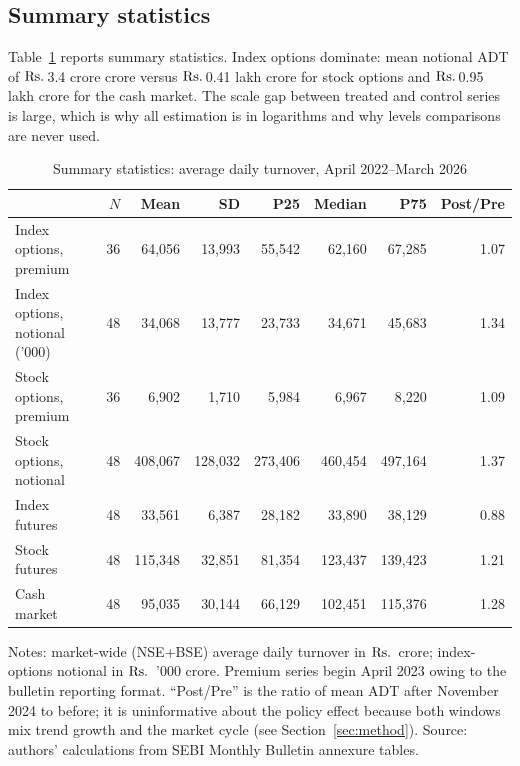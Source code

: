 \documentclass[12pt]{article}
\newcommand{\rupee}{\text{Rs.}\,}
\begin{document}
\subsection{Summary statistics}

Table~\ref{tab:sumstats} reports summary statistics. Index options dominate:
mean notional ADT of \(\text{\rupee}\)3.4 crore crore versus
\(\text{\rupee}\)0.41 lakh crore for stock options and
\(\text{\rupee}\)0.95 lakh crore for the cash market. The scale gap between
treated and control series is large, which is why all estimation is in
logarithms and why levels comparisons are never used.

\begin{table}[H]
\centering
\caption{Summary statistics: average daily turnover, April 2022--March 2026}
\label{tab:sumstats}
\small
\begin{threeparttable}
\begin{tabular}{lrrrrrrr}
\toprule
 & $N$ & Mean & SD & P25 & Median & P75 & Post/Pre \\
\midrule
Index options, premium & 36 & 64,056 & 13,993 & 55,542 & 62,160 & 67,285 & 1.07 \\
Index options, notional ('000) & 48 & 34,068 & 13,777 & 23,733 & 34,671 & 45,683 & 1.34 \\
Stock options, premium & 36 & 6,902 & 1,710 & 5,984 & 6,967 & 8,220 & 1.09 \\
Stock options, notional & 48 & 408,067 & 128,032 & 273,406 & 460,454 & 497,164 & 1.37 \\
Index futures & 48 & 33,561 & 6,387 & 28,182 & 33,890 & 38,129 & 0.88 \\
Stock futures & 48 & 115,348 & 32,851 & 81,354 & 123,437 & 139,423 & 1.21 \\
Cash market & 48 & 95,035 & 30,144 & 66,129 & 102,451 & 115,376 & 1.28 \\
\bottomrule
\end{tabular}
\begin{tablenotes}\footnotesize
\item Notes: market-wide (NSE+BSE) average daily turnover in
\(\text{\rupee}\) crore; index-options notional in
\(\text{\rupee}\) '000 crore. Premium series begin April 2023 owing to the
bulletin reporting format. ``Post/Pre'' is the ratio of mean ADT after
November 2024 to before; it is uninformative about the policy effect
because both windows mix trend growth and the market cycle (see
Section~\ref{sec:method}). Source: authors' calculations from SEBI Monthly
Bulletin annexure tables.
\end{tablenotes}
\end{threeparttable}
\end{table}
\end{document}
